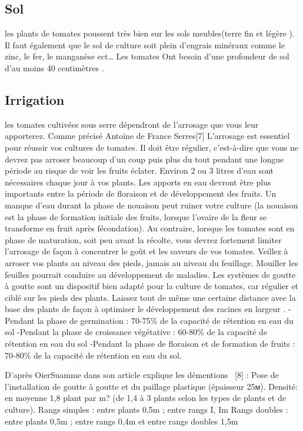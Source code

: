 \subsection{Sol}
les plants de tomates poussent très bien sur les sols meubles(terre fin et légère ). Il faut également que le sol de culture soit plein d’engrais minéraux comme le zinc, le fer, le manganèse ect… Les tomates Ont besoin d’une profondeur de sol d’au moins 40 centimètres .
\subsection{Irrigation}
les tomates cultivées sous serre dépendront de l'arrosage que vous leur apporterez. Comme précisé Antoine de France Serres[7] L'arrosage est essentiel pour réussir vos cultures de tomates. Il doit être régulier, c'est-à-dire que vous ne devrez pas arroser beaucoup d'un coup puis plus du tout pendant une longue période au risque de voir les fruits éclater. Environ 2 ou 3 litres d'eau sont nécessaires chaque jour à vos plants.
Les apports en eau devront être plus importants entre la période de floraison et de développement des fruits. Un manque d'eau durant la phase de nouaison peut ruiner votre culture (la nouaison est la phase de formation initiale des fruits, lorsque l'ovaire de la fleur se transforme en fruit après fécondation). Au contraire, lorsque les tomates sont en phase de maturation, soit peu avant la récolte, vous devrez fortement limiter l'arrosage de façon à concentrer le goût et les saveurs de vos tomates.
Veillez à arroser vos plants au niveau des pieds, jamais au niveau du feuillage. Mouiller les feuilles pourrait conduire au développement de maladies.
Les systèmes de goutte à goutte sont un dispositif bien adapté pour la culture de tomates, car régulier et ciblé sur les pieds des plants. Laissez tout de même une certaine distance avec la base des plants de façon à optimiser le développement des racines en largeur .
\newline
-Pendant la phase de germination : 70-75\% de la capacité de rétention en eau du sol \newline
-Pendant la phase de croissance végétative : 60-80\% de la capacité de rétention en eau du sol\newline
-Pendant la phase de floraison et de formation de fruits : 70-80\% de la capacité de rétention en eau du sol.


D’après OierSuamme dans son article explique les démentions  [8] :\newline
Pose de l'installation de goutte à goutte et du paillage plastique (épaisseur 25м).
Densité: en moyenne 1,8 plant par m? (de 1,4 à 3 plants selon les types de plants et de culture).
﻿﻿Rangs simples : entre plants 0,5m ; entre rangs I, Im
﻿﻿Rangs doubles : entre plants 0,5m ; entre rangs 0,4m et entre rangs doubles 1,5m

